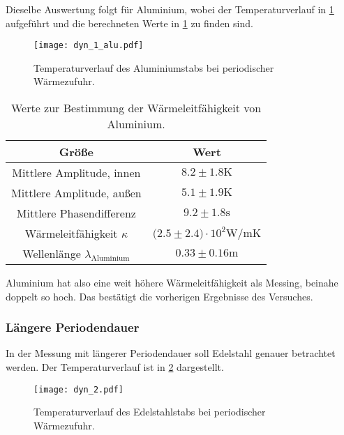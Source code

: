   \noindent Dieselbe Auswertung folgt für Aluminium, wobei der Temperaturverlauf in \ref{fig:aludyn} aufgeführt und die berechneten Werte in \ref{tab:kappaalu} zu finden sind.

  \begin{figure}
    \centering
    \texttt{[image: dyn\_1\_alu.pdf]}
    \caption{Temperaturverlauf des Aluminiumstabs bei periodischer Wärmezufuhr.}
    \label{fig:aludyn}
  \end{figure}

  \begin{table}
    \centering
    \caption{Werte zur Bestimmung der Wärmeleitfähigkeit von Aluminium.}
    \label{tab:kappaalu}
    \begin{tabular}{c c }
      \toprule
      Größe & Wert \\
      \midrule %
      Mittlere Amplitude, innen & $8.2 \pm 1.8 \si{\kelvin}$\\
      Mittlere Amplitude, außen & $5.1 \pm 1.9 \si{\kelvin}$\\
      Mittlere Phasendifferenz & $9.2 \pm 1.8 \si{\s}$ \\
      Wärmeleitfähigkeit $\kappa$ & $\bigl(2.5 \pm 2.4\bigr) \cdot 10^{2} \si{\watt\per\m\kelvin}$ \\ %
      Wellenlänge $\lambda_{\text{Aluminium}}$ & $0.33 \pm 0.16 \si{\m} $\\ 
      \bottomrule
    \end{tabular}
  \end{table}

  \FloatBarrier

  \noindent Aluminium hat also eine weit höhere Wärmeleitfähigkeit als Messing, beinahe doppelt so hoch. Das bestätigt die vorherigen Ergebnisse des Versuches.

  \subsubsection{Längere Periodendauer}

  In der Messung mit längerer Periodendauer soll Edelstahl genauer betrachtet werden. Der Temperaturverlauf ist in \ref{fig:dynedel} dargestellt.

  \begin{figure}
    \centering
    \texttt{[image: dyn\_2.pdf]}
    \caption{Temperaturverlauf des Edelstahlstabs bei periodischer Wärmezufuhr.}
    \label{fig:dynedel}
  \end{figure}


